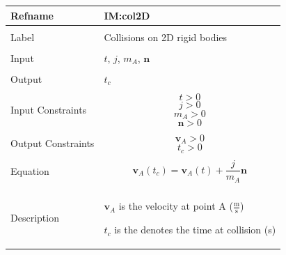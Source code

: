\documentclass[12pt]{article}
\begin{document}
\noindent \begin{minipage}{\textwidth}
\begin{tabular}{p{} p{}}
\toprule \textbf{Refname} & \textbf{IM:col2D}
\label{IM:col2D}
\\ \midrule \\
Label & Collisions on 2D rigid bodies
\\ \midrule \\
Input & $t$, $j$, ${m_{A}}$, $\mathbf{n}$
\\ \midrule \\
Output & ${t_{c}}$
\\ \midrule \\
Input Constraints & \begin{dmath}
                    t>0
                    \end{dmath}
                    \begin{dmath}
                    j>0
                    \end{dmath}
                    \begin{dmath}
                    {m_{A}}>0
                    \end{dmath}
                    \begin{dmath}
                    \mathbf{n}>0
                    \end{dmath}
\\ \midrule \\
Output Constraints & \begin{dmath}
                     {\mathbf{v}_{A}}>0
                     \end{dmath}
                     \begin{dmath}
                     {t_{c}}>0
                     \end{dmath}
\\ \midrule \\
Equation & \begin{dmath}
           {\mathbf{v}_{A}}\left({t_{c}}\right)={\mathbf{v}_{A}}\left(t\right)+\frac{j}{{m_{A}}} \mathbf{n}
           \end{dmath}
\\ \midrule \\
Description & \begin{symbDescription}
              \item{${\mathbf{v}_{A}}$ is the velocity at point A ($\frac{\text{m}}{\text{s}}$)}
              \item{${t_{c}}$ is the denotes the time at collision (s)}

\end{symbDescription}
\end{tabular}
\end{minipage}
\end{document}
